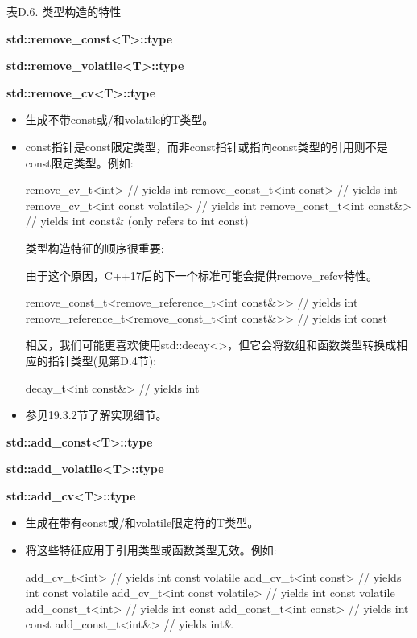\begin{center}
表D.6. 类型构造的特性
\end{center}

\textbf{std::remove\_const<T>::type}

\textbf{std::remove\_volatile<T>::type}

\textbf{std::remove\_cv<T>::type}

\begin{itemize}
\item
生成不带const或/和volatile的T类型。

\item
const指针是const限定类型，而非const指针或指向const类型的引用则不是const限定类型。例如:

\begin{cpp}
remove_cv_t<int> // yields int
remove_const_t<int const> // yields int
remove_cv_t<int const volatile> // yields int
remove_const_t<int const&> // yields int const& (only refers to int const)
\end{cpp}

类型构造特征的顺序很重要:

\begin{notice}
由于这个原因，C++17后的下一个标准可能会提供remove\_refcv特性。
\end{notice}

\begin{cpp}
remove_const_t<remove_reference_t<int const&>> // yields int
remove_reference_t<remove_const_t<int const&>> // yields int const
\end{cpp}

相反，我们可能更喜欢使用std::decay<>，但它会将数组和函数类型转换成相应的指针类型(见第D.4节):

\begin{cpp}
decay_t<int const&> // yields int
\end{cpp}

\item
参见19.3.2节了解实现细节。
\end{itemize}

\textbf{std::add\_const<T>::type}

\textbf{std::add\_volatile<T>::type}

\textbf{std::add\_cv<T>::type}

\begin{itemize}
\item
生成在带有const或/和volatile限定符的T类型。

\item
将这些特征应用于引用类型或函数类型无效。例如:
\begin{cpp}
add_cv_t<int> // yields int const volatile
add_cv_t<int const> // yields int const volatile
add_cv_t<int const volatile> // yields int const volatile
add_const_t<int> // yields int const
add_const_t<int const> // yields int const
add_const_t<int&> // yields int&
\end{cpp}
\end{itemize}

